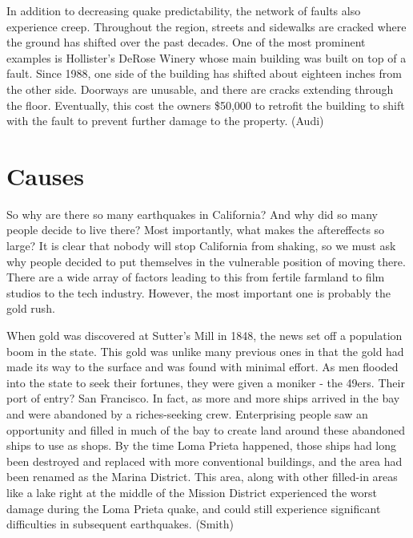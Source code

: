\documentclass[12pt]{article}
\begin{document}
In addition to decreasing quake predictability, the network of faults also experience creep.  Throughout the region, streets and sidewalks are cracked where the ground has shifted over the past decades.  One of the most prominent examples is Hollister's DeRose Winery whose main building was built on top of a fault.  Since 1988, one side of the building has shifted about eighteen inches from the other side.  Doorways are unusable, and there are cracks extending through the floor. Eventually, this cost the owners \$50,000 to retrofit the building to shift with the fault to prevent further damage to the property.  (Audi)

\section*{Causes}
So why are there so many earthquakes in California?  And why did so many people decide to live there?  Most importantly, what makes the aftereffects so large?  It is clear that nobody will stop California from shaking, so we must ask why people decided to put themselves in the vulnerable position of moving there.  There are a wide array of factors leading to this from fertile farmland to film studios to the tech industry.  However, the most important one is probably the gold rush.

When gold was discovered at Sutter's Mill in 1848, the news set off a population boom in the state.  This gold was unlike many previous ones in that the gold had made its way to the surface and was found with minimal effort.  As men flooded into the state to seek their fortunes, they were given a moniker - the 49ers.  Their port of entry?  San Francisco.  In fact, as more and more ships arrived in the bay and were abandoned by a riches-seeking crew.  Enterprising people saw an opportunity and filled in much of the bay to create land around these abandoned ships to use as shops.  By the time Loma Prieta happened, those ships had long been destroyed and replaced with more conventional buildings, and the area had been renamed as the Marina District.  This area, along with other filled-in areas like a lake right at the middle of the Mission District experienced the worst damage during the Loma Prieta quake, and could still experience significant difficulties in subsequent earthquakes. (Smith)
\end{document}
